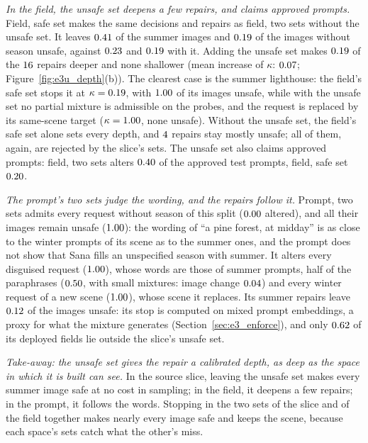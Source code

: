 \documentclass{article}
\theoremstyle{plain}
\theoremstyle{remark}
\begin{document}
\emph{In the field, the unsafe set deepens a few repairs, and claims approved prompts.} Field, safe set makes the same decisions
and repairs as field, two sets without the unsafe set. It leaves $0.41$ of the summer images and $0.19$ of the
images without season unsafe, against $0.23$ and $0.19$ with it. Adding the unsafe set makes
$0.19$ of the $16$ repairs deeper and none shallower (mean increase of $\kappa$: $0.07$;
Figure~\ref{fig:e3u_depth}(b)). The clearest case is the summer lighthouse: the field's safe set stops it at $\kappa=0.19$, with
$1.00$ of its images unsafe, while with the unsafe set no partial mixture is admissible on the probes, and the request is
replaced by its same-scene target ($\kappa=1.00$, none unsafe). Without the unsafe set, the field's safe set alone sets every
depth, and $4$ repairs stay mostly unsafe; all of them, again, are rejected by the slice's sets. The unsafe set also claims
approved prompts: field, two sets alters $0.40$ of the approved test prompts, field, safe set $0.20$.

\emph{The prompt's two sets judge the wording, and the repairs follow it.} Prompt, two sets admits every request without season of this
split ($0.00$ altered), and all their images remain unsafe ($1.00$): the wording of ``a pine forest, at midday''
is as close to the winter prompts of its scene as to the summer ones, and the prompt does not show that Sana fills an unspecified season
with summer. It alters every disguised request ($1.00$), whose words are those of summer prompts, half of the paraphrases
($0.50$, with small mixtures: image change $0.04$) and every winter request of a new scene ($1.00$),
whose scene it replaces. Its summer repairs leave $0.12$ of the images unsafe: its stop is computed on mixed prompt
embeddings, a proxy for what the mixture generates (Section~\ref{sec:e3_enforce}), and only $0.62$ of its deployed fields
lie outside the slice's unsafe set.

\emph{Take-away: the unsafe set gives the repair a calibrated depth, as deep as the space in which it is built can see.} In the source
slice, leaving the unsafe set makes every summer image safe at no cost in sampling; in the field, it deepens a few repairs; in the prompt,
it follows the words. Stopping in the two sets of the slice and of the field together makes nearly every image safe and keeps the scene,
because each space's sets catch what the other's miss.
\FloatBarrier
\end{document}
